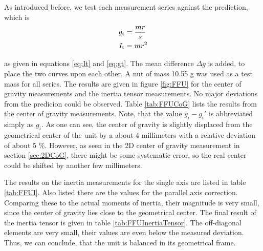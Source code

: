 \documentclass[journal]{IEEEtran}
\begin{document}
As introduced before, we test each measurement series against the prediction, which is
\begin{align*}
	g_{\textup{t}} & =	\frac{mr}{s} \\
	I_{\textup{t}} & = mr^2
\end{align*}

as given in equations \eqref{eq:It} and \eqref{eq:gt}. The mean difference $\Delta g$ is added, to place the two curves upon each other.
A nut of mass 10.55 g was used as a test mass for all series.
The results are given in figure \ref{fig:FFU} for the center of gravity measurements and the inertia tensor measurements.
No major deviations from the predicion could be observed.
Table \ref{tab:FFUCoG} lists the results from the center of gravity measurements.
Note, that the value $g_i - g_i'$ is abbreviated simply as $g_i$.
As one can see, the center of gravity is slightly displaced from the geometrical center of the unit by a about 4 millimeters with a relative deviation of about 5 \%.
However, as seen in the 2D center of gravity measurement in section \ref{sec:2DCoG}, there might be some systematic error, so the real center could be shifted by another few millimeters.

The results on the inertia measurements for the single axis are listed in table \ref{tab:FFUI}. Also listed there are the values for the parallel axis correction. Comparing these to the actual moments of inertia, their magnitude is very small, since the center of gravity lies close to the geometrical center.
The final result of the inertia tensor is given in table \ref{tab:FFUInertiaTensor}. The off-diagonal elements are very small, their values are even below the measured deviation.
Thus, we can conclude, that the unit is balanced in its geometrical frame.
\end{document}
